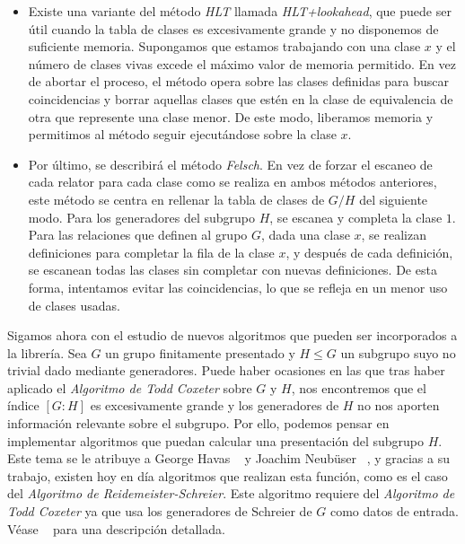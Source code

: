 \begin{itemize}
    \item  Existe una variante del método \textit{HLT}  llamada \textit{HLT+lookahead}, que puede ser útil cuando la tabla de clases es excesivamente grande y no disponemos de suficiente memoria. Supongamos que estamos trabajando con una clase $x$ y el número de clases vivas excede el máximo valor de memoria permitido. En vez de abortar el proceso, el método opera sobre las clases definidas para buscar coincidencias y borrar aquellas clases que estén en la clase de equivalencia de otra que represente una clase menor. De este modo, liberamos memoria y permitimos al método seguir ejecutándose sobre la clase $x$.
    \item Por último, se describirá el método \textit{Felsch}. En vez de forzar el escaneo de cada relator para cada clase como se realiza en ambos métodos anteriores, este método se centra en rellenar la tabla de clases de $G/H$ del siguiente modo. Para los generadores del subgrupo $H$, se escanea y completa la clase $1$. Para las relaciones que definen al grupo $G$, dada una clase $x$,  se realizan definiciones para completar la fila de la clase $x$, y después de cada definición, se escanean todas las clases sin completar con nuevas definiciones. De esta forma, intentamos evitar las coincidencias, lo que se refleja en un menor uso de clases usadas.

\end{itemize}

Sigamos ahora con el estudio de nuevos algoritmos que pueden ser incorporados a la librería.
Sea $G$ un grupo finitamente presentado y $H \leq G$ un subgrupo suyo no trivial dado mediante generadores. Puede haber ocasiones en las que tras haber aplicado el  \textit{Algoritmo de Todd Coxeter} sobre $G$ y $H$, nos encontremos que el índice $[G:H]$ es excesivamente grande y los generadores de $H$ no nos aporten información relevante sobre el subgrupo. Por ello, podemos pensar en implementar algoritmos que puedan calcular una presentación del subgrupo $H$. Este tema se le atribuye a George Havas ~\cite{havas} y Joachim Neubüser ~\cite{neu}, y gracias a su trabajo, existen hoy en día algoritmos que realizan esta función, como es el caso del \textit{Algoritmo de Reidemeister-Schreier}. Este algoritmo requiere del \textit{Algoritmo de Todd Coxeter} ya que usa los generadores de Schreier de $G$ como datos de entrada.  Véase ~\cite{green} para una descripción detallada.




